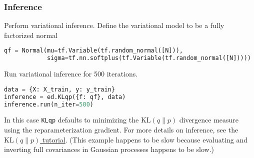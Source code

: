 \subsubsection{Inference}

Perform variational inference.
Define the variational model to be a fully factorized normal
\begin{lstlisting}[language=Python]
qf = Normal(mu=tf.Variable(tf.random_normal([N])),
            sigma=tf.nn.softplus(tf.Variable(tf.random_normal([N]))))
\end{lstlisting}

Run variational inference for 500 iterations.
\begin{lstlisting}[language=Python]
data = {X: X_train, y: y_train}
inference = ed.KLqp({f: qf}, data)
inference.run(n_iter=500)
\end{lstlisting}
In this case
\texttt{KLqp} defaults to minimizing the
$\text{KL}(q\|p)$ divergence measure using the reparameterization
gradient.
For more details on inference, see the \href{/tutorials/klqp}{$\text{KL}(q\|p)$ tutorial}.
(This example happens to be slow because evaluating and inverting full
covariances in Gaussian processes happens to be slow.)


